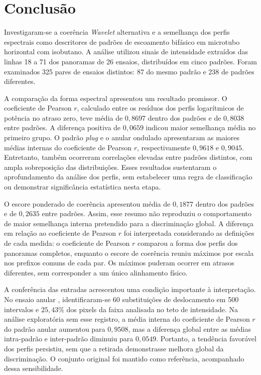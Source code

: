 \chapter{Conclusão}\label{cap:conclusao}

Investigaram-se a coerência \textit{Wavelet} alternativa e a semelhança dos perfis
espectrais como descritores de padrões de escoamento bifásico em microtubo horizontal com
isobutano. A análise utilizou sinais de intensidade extraídos das linhas 18 a 71 dos
panoramas de 26 ensaios, distribuídos em cinco padrões. Foram examinados 325 pares de
ensaios distintos: 87 do mesmo padrão e 238 de padrões diferentes.

A comparação da forma espectral apresentou um resultado promissor. O coeficiente de
Pearson $r$, calculado entre os resíduos dos perfis logarítmicos de potência no atraso
zero, teve média de $0{,}8697$ dentro dos padrões e de $0{,}8038$ entre padrões. A diferença
positiva de $0{,}0659$ indicou maior semelhança média no primeiro grupo. O padrão
\textit{plug} e o anular ondulado apresentaram as maiores médias internas do coeficiente
de Pearson $r$, respectivamente $0{,}9618$ e $0{,}9045$. Entretanto, também ocorreram
correlações elevadas entre padrões distintos, com ampla sobreposição das distribuições.
Esses resultados sustentaram o aprofundamento da análise dos perfis, sem estabelecer uma
regra de classificação ou demonstrar significância estatística nesta etapa.

O escore ponderado de coerência apresentou média de $0{,}1877$ dentro dos padrões e de
$0{,}2635$ entre padrões. Assim, esse resumo não reproduziu o comportamento de maior
semelhança interna pretendido para a discriminação global. A diferença em relação ao
coeficiente de Pearson $r$ foi interpretada considerando as definições de cada medida:
o coeficiente de Pearson $r$ comparou a forma dos perfis dos panoramas completos, enquanto
o escore de coerência reuniu máximos por escala nos prefixos comuns de cada par. Os máximos
puderam ocorrer em atrasos diferentes, sem corresponder a um único alinhamento físico.

A conferência das entradas acrescentou uma condição importante à interpretação. No ensaio
anular , identificaram-se 60 substituições de deslocamento em 500
intervalos e $25{,}43\%$ dos pixels da faixa analisada no teto de intensidade. Na análise
exploratória sem esse registro, a média interna do coeficiente de Pearson $r$ do padrão
anular aumentou para $0{,}9508$, mas a diferença global entre as médias intra-padrão e
inter-padrão diminuiu para $0{,}0549$. Portanto, a tendência favorável dos perfis persistiu,
sem que a retirada demonstrasse melhora global da discriminação. O conjunto original foi
mantido como referência, acompanhado dessa sensibilidade.

